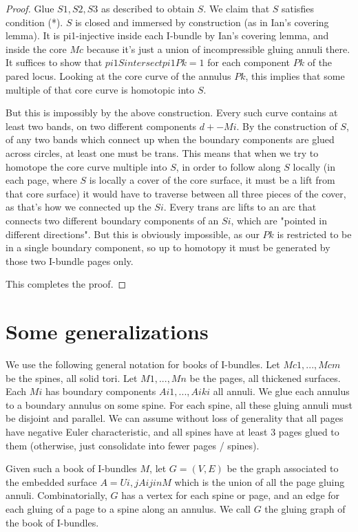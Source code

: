 \documentclass[12pt]{amsart}
\theoremstyle{definition}
\begin{document}
\begin{proof}
Glue $S1,S2,S3$ as described to obtain $S$. We claim that $S$ satisfies condition
(*). $S$ is closed and immersed by construction (as in Ian's covering lemma). It
is pi1-injective inside each I-bundle by Ian's covering lemma, and inside the
core $Mc$ because it's just a union of incompressible gluing annuli there. It
suffices to show that $pi1S intersect pi1Pk = 1$ for each component $Pk$ of the
pared locus. Looking at the core curve of the annulus $Pk$, this implies that
some multiple of that core curve is homotopic into $S$.

But this is impossibly by the above construction. Every such curve contains at
least two bands, on two different components $d+-Mi$. By the construction of
$S$,
of any two bands which connect up when the boundary components are glued across
circles, at least one must be trans. This means that when we try to homotope
the core curve multiple into $S$, in order to follow along $S$ locally (in each
page, where $S$ is locally a cover of the core surface, it must be a lift from
that core surface) it would have to traverse between all three pieces of the
cover, as that's how we connected up the $Si$. Every trans arc lifts to an arc
that connects two different boundary components of an $Si$, which are "pointed in
different directions". But this is obviously impossible, as our $Pk$ is
restricted to be in a single boundary component, so up to homotopy it must be
generated by those two I-bundle pages only.

This completes the proof.

\end{proof}

\section{Some generalizations}

We use the following general notation for books of I-bundles. Let $Mc1,...,Mcm$
be the spines, all solid tori. Let $M1,...,Mn$ be the pages, all thickened
surfaces. Each $Mi$ has boundary components $Ai1,...,Aiki$ all annuli. We glue each
annulus to a boundary annulus on some spine. For each spine, all these gluing
annuli must be disjoint and parallel. We can assume without loss of generality
that all pages have negative Euler characteristic, and all spines have at least
3 pages glued to them (otherwise, just consolidate into fewer pages / spines).

Given such a book of I-bundles $M$, let $G=(V,E)$ be the graph associated to the
embedded surface $A = Ui,j Aij in M$ which is the union of all the page gluing
annuli. Combinatorially, $G$ has a vertex for each spine or page, and an edge for
each gluing of a page to a spine along an annulus. We call $G$ the gluing graph
of the book of I-bundles.
\end{document}
